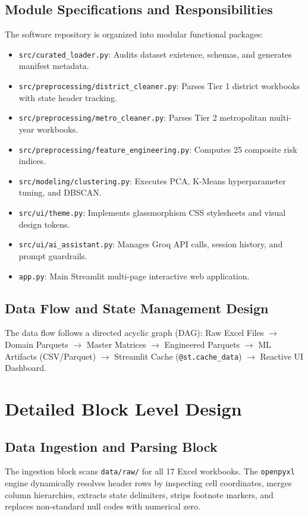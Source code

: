 \documentclass[12pt,a4paper]{report}
\begin{document}
\section{Module Specifications and Responsibilities}
The software repository is organized into modular functional packages:
\begin{itemize}[leftmargin=*]
    \item \texttt{src/curated\_loader.py}: Audits dataset existence, schemas, and generates manifest metadata.
    \item \texttt{src/preprocessing/district\_cleaner.py}: Parses Tier 1 district workbooks with state header tracking.
    \item \texttt{src/preprocessing/metro_cleaner.py}: Parses Tier 2 metropolitan multi-year workbooks.
    \item \texttt{src/preprocessing/feature_engineering.py}: Computes 25 composite risk indices.
    \item \texttt{src/modeling/clustering.py}: Executes PCA, K-Means hyperparameter tuning, and DBSCAN.
    \item \texttt{src/ui/theme.py}: Implements glassmorphism CSS stylesheets and visual design tokens.
    \item \texttt{src/ui/ai_assistant.py}: Manages Groq API calls, session history, and prompt guardrails.
    \item \texttt{app.py}: Main Streamlit multi-page interactive web application.
\end{itemize}

\section{Data Flow and State Management Design}
The data flow follows a directed acyclic graph (DAG): Raw Excel Files $\to$ Domain Parquets $\to$ Master Matrices $\to$ Engineered Parquets $\to$ ML Artifacts (CSV/Parquet) $\to$ Streamlit Cache (\texttt{@st.cache\_data}) $\to$ Reactive UI Dashboard.

\chapter{Detailed Block Level Design}

\section{Data Ingestion and Parsing Block}
The ingestion block scans \texttt{data/raw/} for all 17 Excel workbooks. The \texttt{openpyxl} engine dynamically resolves header rows by inspecting cell coordinates, merges column hierarchies, extracts state delimiters, strips footnote markers, and replaces non-standard null codes with numerical zero.
\end{document}
